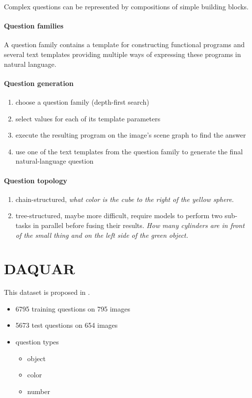 Complex questions can be represented by compositions of simple building blocks.

\paragraph{Question families}
A question family contains a template for constructing functional programs and several text templates providing multiple ways of expressing these programs in natural language.


\paragraph{Question generation}
\begin{enumerate}
	\item choose a question family (depth-first search)
	\item select values for each of its template parameters
	\item execute the resulting program on the image's scene graph to find the answer
	\item use one of the text templates from the question family to generate the final natural-language question
\end{enumerate}


\paragraph{Question topology}
\begin{enumerate}
	\item chain-structured, \textit{what color is the cube to the right of the yellow sphere}.
	\item tree-structured, maybe more difficult, require models to perform two sub-tasks in parallel before fusing their results. \textit{How many cylinders are in front of the small thing and on the left side of the green object.}
\end{enumerate}






\section{DAQUAR}


This dataset is proposed in \cite{Daquar}. 


\begin{itemize}
	\item 6795 training questions on 795 images
	\item 5673 test questions on 654 images
	\item question types
	\begin{itemize}
		\item object
		\item color
		\item number
	\end{itemize}
\end{itemize}


